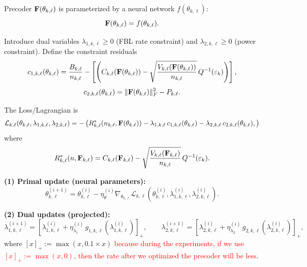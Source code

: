 \documentclass[a4paper, 12pt, onecolumn, journal, twoside, draftclsnofoot]{IEEEtran}
\begin{document}
Precoder ${\bf F}(\theta_{k,\ell})$ is parameterized by a neural network $f(\theta_{k,\ell})$:
\begin{equation*}
{\bf F}(\theta_{k,\ell}) = f(\theta_{k,\ell}).
\end{equation*}

Introduce dual variables $\lambda_{1,k,\ell}\ge 0$ (FBL rate constraint) and $\lambda_{2,k,\ell}\ge 0$ (power constraint). Define the constraint residuals
\begin{equation*}
c_{1,k,\ell}(\theta_{k,\ell})
 = 
\frac{B_{k,\ell}}{n_{k,\ell}}
-\left[
\left(
C_{k,\ell}({\bf F}(\theta_{k,\ell}))
-
\sqrt{\frac{V_{k,\ell}({\bf F}(\theta_{k,\ell}))}{n_{k,\ell}}}\,
Q^{-1}(\varepsilon_k)
\right) \right],
\end{equation*}
\begin{equation*}
c_{2,k,\ell}(\theta_{k,\ell})
=
\|{\bf F}(\theta_{k,\ell})\|_F^2 - P_{k,\ell}.
\end{equation*}

The Loss/Lagrangian is
\begin{equation*}
\mathcal{L}_{k,\ell}(\theta_{k,\ell},\lambda_{1,k,\ell},\lambda_{2,k,\ell})
= -\left(
R^*_{k,\ell}\!\left(n_{k,\ell},{\bf F}(\theta_{k,\ell})\right)
-\lambda_{1,k,\ell}\, c_{1,k,\ell}(\theta_{k,\ell})
-\lambda_{2,k,\ell}\, c_{2,k,\ell}(\theta_{k,\ell}),
 \right) \end{equation*}
where
\begin{equation*}
R^*_{k,\ell}(n,{\bf F}_{k, \ell})
=
C_{k,\ell}({\bf F}_{k, \ell})
-
\sqrt{\frac{V_{k,\ell}({\bf F}_{k, \ell})}{n_{k, \ell}}}\,Q^{-1}(\varepsilon_k).
\end{equation*}

\textbf{(1) Primal update (neural parameters):}
\begin{equation*}
\theta_{k,\ell}^{(i+1)}
=
\theta_{k,\ell}^{(i)}
-
\eta_{\theta}^{(i)}
\nabla_{\theta_{k,\ell}}
\mathcal{L}_{k,\ell}\!\left(
\theta_{k,\ell}^{(i)},\lambda_{1,k,\ell}^{(i)},\lambda_{2,k,\ell}^{(i)}
\right).
\end{equation*}

\textbf{(2) Dual updates (projected):}
\begin{equation*}
\lambda_{1,k,\ell}^{(i+1)}
=
\left[
\lambda_{1,k,\ell}^{(i)}
+
\eta_{\lambda_1}^{(i)}\, g_{1,k,\ell}\!\left( \lambda_{1,k,\ell}^{(i)} \right)
\right]_+,
\qquad
\lambda_{2,k,\ell}^{(i+1)}
=
\left[
\lambda_{2,k,\ell}^{(i)}
+
\eta_{\lambda_2}^{(i)}\, g_{2,k,\ell}\!\left( \lambda_{2,k,\ell}^{(i)} \right)
\right]_+,
\end{equation*}
where $[x]_+ := \max(x,0.1 \times x)$ \textcolor{red}{because during the experiments, if we use $[x]_+ := \max(x, 0)$, then the rate after we optimized the precoder will be less}.
\end{document}
